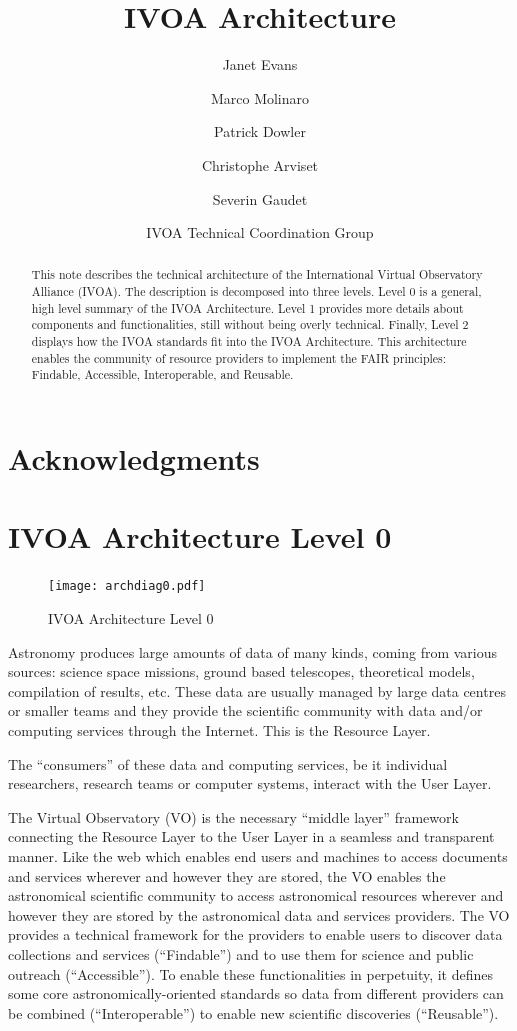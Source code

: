 \documentclass[11pt,letter]{ivoa}
\title{IVOA Architecture}
\author{Janet Evans}
\author{Marco Molinaro}
\author{Patrick Dowler}
\author{Christophe Arviset}
\author{Severin Gaudet}
\author{IVOA Technical Coordination Group}
\begin{document}
\begin{abstract}
This note describes the technical architecture of the International
Virtual Observatory Alliance
(IVOA). The description is decomposed 
into three levels. Level 0 is a general, high level summary of the IVOA
Architecture.
Level 1 provides more details about components and functionalities,
still without
being overly technical. Finally, Level 2 displays how the IVOA standards
fit into
the IVOA Architecture. This architecture enables the community of
resource providers to
implement the FAIR principles: Findable, Accessible, Interoperable, and
Reusable.
\end{abstract}

\section*{Acknowledgments}

\section{IVOA Architecture Level 0}

\begin{figure}[h]
\centering
\texttt{[image: archdiag0.pdf]}
\caption{IVOA Architecture Level 0}
\label{fig:architecture0}
\end{figure}

Astronomy produces large amounts of data of many kinds, coming from
various sources:
science space missions, ground based telescopes, theoretical models,
compilation of
results, etc. These data are usually managed by large data centres or
smaller teams
and they provide the scientific community with data and/or computing
services
through the Internet. This is the Resource Layer. 

The ``consumers'' of these data and computing services, be it individual
researchers,
research teams or computer systems, interact with the User Layer. 

The Virtual Observatory (VO) is the necessary ``middle layer'' framework
connecting the
Resource Layer to the User Layer in a seamless and transparent manner.
Like the web
which enables end  users and machines to access documents and services 
wherever and however they are stored, the VO enables the astronomical
scientific
community to access astronomical resources wherever and however they are
stored by
the astronomical data and services providers. The VO provides a
technical framework
for the providers to enable users to discover data collections and
services
(``Findable'') and to use them for science and public outreach
(``Accessible''). To
enable these functionalities in perpetuity, it defines some core
astronomically-oriented
standards so data from different providers can be combined
(``Interoperable'') to enable
new scientific discoveries (``Reusable'').
\end{document}
